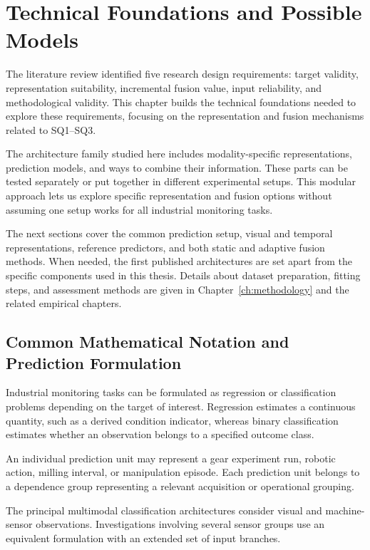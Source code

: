 \chapter{Technical Foundations and Possible Models}
\label{ch:foundations}

The literature review identified five research design requirements: target validity, representation suitability, incremental fusion value, input reliability, and methodological validity. This chapter builds the technical foundations needed to explore these requirements, focusing on the representation and fusion mechanisms related to SQ1–SQ3.

The architecture family studied here includes modality-specific representations, prediction models, and ways to combine their information. These parts can be tested separately or put together in different experimental setups. This modular approach lets us explore specific representation and fusion options without assuming one setup works for all industrial monitoring tasks.

The next sections cover the common prediction setup, visual and temporal representations, reference predictors, and both static and adaptive fusion methods. When needed, the first published architectures are set apart from the specific components used in this thesis. Details about dataset preparation, fitting steps, and assessment methods are given in Chapter~\ref{ch:methodology} and the related empirical chapters.

\section{Common Mathematical Notation and Prediction Formulation}

Industrial monitoring tasks can be formulated as regression or classification problems depending on the target of interest. Regression estimates a continuous quantity, such as a derived condition indicator, whereas binary classification estimates whether an observation belongs to a specified outcome class.

An individual prediction unit may represent a gear experiment run, robotic action, milling interval, or manipulation episode. Each prediction unit belongs to a dependence group representing a relevant acquisition or operational grouping.

The principal multimodal classification architectures consider visual and machine-sensor observations. Investigations involving several sensor groups use an equivalent formulation with an extended set of input branches.

